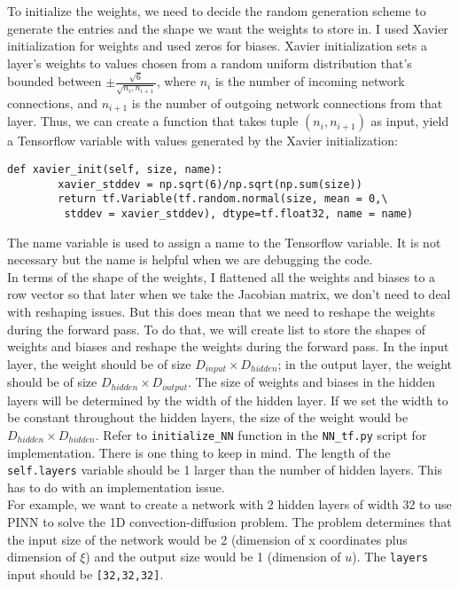 \documentclass{article}
\begin{document}
To initialize the weights, we need to decide the random generation scheme to generate the entries and the shape we want the weights to store in. I used Xavier initialization for weights and used zeros for biases. Xavier initialization sets a layer’s weights to values chosen from a random uniform distribution that’s bounded between $\pm \frac{\sqrt{6}}{\sqrt{n_i,n_{i+1}}}$, where $n_i$ is the number of incoming network connections, and $n_{i+1}$ is the number of outgoing network connections from that layer. Thus, we can create a function that takes tuple $(n_i, n_{i+1})$ as input, yield a Tensorflow variable with values generated by the Xavier initialization:
\begin{lstlisting}
def xavier_init(self, size, name):
		xavier_stddev = np.sqrt(6)/np.sqrt(np.sum(size)) 
		return tf.Variable(tf.random.normal(size, mean = 0,\
		 stddev = xavier_stddev), dtype=tf.float32, name = name)
\end{lstlisting}

The name variable is used to assign a name to the Tensorflow variable. It is not necessary but the name is helpful when we are debugging the code. \\

In terms of the shape of the weights, I flattened all the weights and biases to a row vector so that later when we take the Jacobian matrix, we don't need to deal with reshaping issues. But this does mean that we need to reshape the weights during the forward pass. To do that, we will create list to store the shapes of weights and biases and reshape the weights during the forward pass. In the input layer, the weight should be of size $D_{input}\times D_{hidden}$; in the output layer, the weight should be of size $D_{hidden}\times D_{output}$. The size of weights and biases in the hidden layers will be determined by the width of the hidden layer. If we set the width to be constant throughout the hidden layers, the size of the weight would be $D_{hidden}\times D_{hidden}$. Refer to \texttt{initialize\_NN} function in the \texttt{NN\_tf.py} script for implementation. There is one thing to keep in mind. The length of the \texttt{self.layers} variable should be 1 larger than the number of hidden layers. This has to do with an implementation issue. \\

For example, we want to create a network with 2 hidden layers of width 32 to use PINN to solve the 1D convection-diffusion problem. The problem determines that the input size of the network would be 2 (dimension of x coordinates plus dimension of $\xi$) and the output size would be 1 (dimension of $u$). The \texttt{layers} input should be \texttt{[32,32,32]}. 
\end{document}
